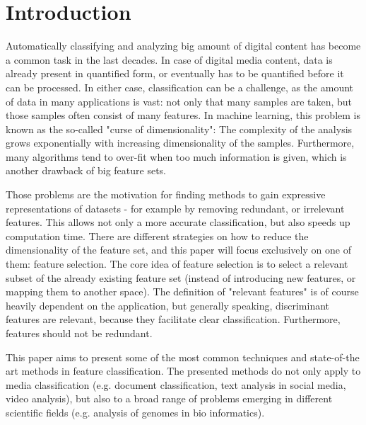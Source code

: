 \section{Introduction}
\label{sec:introduction}


Automatically classifying and analyzing big amount of digital content has become a common task in the last decades. In case of digital media content, data is already present in quantified form, or eventually has to be quantified before it can be processed. In either case, classification can be a challenge, as the amount of data in many applications is vast: not only that many samples are taken, but those samples often consist of many features. In machine learning, this problem is known as the so-called "curse of dimensionality": The complexity of the analysis grows exponentially with increasing dimensionality of the samples. Furthermore, many algorithms tend to over-fit when too much information is given, which is another drawback of big feature sets. \cite{Verikas:02}

Those problems are the motivation for finding methods to gain expressive representations of datasets - for example by removing redundant, or irrelevant features. This allows not only a more accurate classification, but also speeds up computation time. There are different strategies on how to reduce the dimensionality of the feature set, and this paper will focus exclusively on one of them: feature selection. The core idea of feature selection is to select a relevant subset of the already existing feature set (instead of introducing new features, or mapping them to another space). The definition of "relevant features" is of course heavily dependent on the application, but generally speaking, discriminant features are relevant, because they facilitate clear classification. Furthermore, features should not be redundant.

This paper aims to present some of the most common techniques and state-of-the art methods in feature classification. The presented methods do not only apply to media classification (e.g. document classification, text analysis in social media, video analysis), but also to a broad range of problems emerging in different scientific fields (e.g. analysis of genomes in bio informatics).


